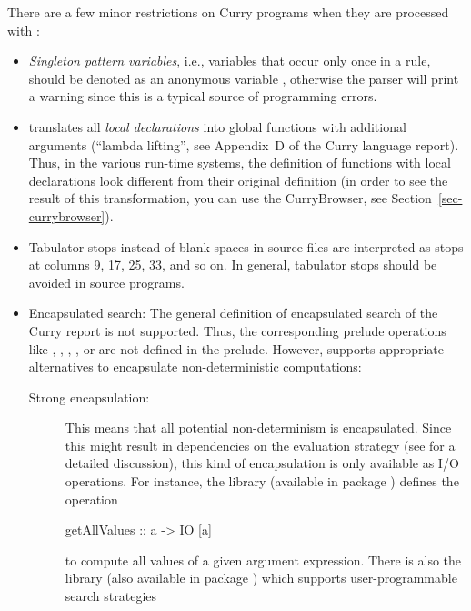 There are a few minor restrictions on Curry programs
when they are processed with \CYS:
\begin{itemize}
\item
{}
\emph{Singleton pattern variables}, i.e., variables that occur only once
in a rule, should be denoted as an anonymous variable \ccode{_},
otherwise the parser will print a warning since this is a
typical source of programming errors.
\item
\CYS translates all \emph{local declarations} into global functions with
additional arguments (``lambda lifting'', see Appendix~D of the
Curry language report).
Thus, in the various run-time systems, the definition of
functions with local declarations look different from
their original definition (in order to see the result
of this transformation, you can use the CurryBrowser, see
Section~\ref{sec-currybrowser}).
\item {}
Tabulator stops instead of blank spaces in source files are
interpreted as stops at columns 9, 17, 25, 33, and so on.
In general, tabulator stops should be avoided in source programs.
\item
Encapsulated search:
The general definition of encapsulated search of the Curry report
\cite{HanusSteiner98PLILP} is not supported.
Thus, the corresponding prelude operations like
,
,
,
, or
are not defined in the \CYS prelude.
However, \CYS supports appropriate alternatives
to encapsulate non-deterministic computations:
\begin{description}
\item[Strong encapsulation:]
This means that all potential
non-determinism is encapsulated. Since this might
result in dependencies on the evaluation strategy
(see \cite{BrasselHanusHuch04JFLP} for a detailed discussion),
this kind of encapsulation is only available as I/O operations.
For instance, the library 
(available in package )
defines the operation
\begin{curry}
getAllValues :: a -> IO [a]
\end{curry}
to compute all values of a given argument expression.
There is also the library 
(also available in package )
which supports user-programmable search strategies

\end{description}
\end{itemize}
